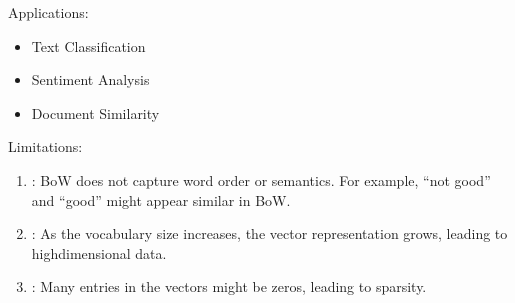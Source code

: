 \documentclass[letterpaper,11pt,english]{sphinxmanual}
\begin{document}
\sphinxAtStartPar
Applications:
\begin{itemize}
\item {} 
\sphinxAtStartPar
Text Classification

\item {} 
\sphinxAtStartPar
Sentiment Analysis

\item {} 
\sphinxAtStartPar
Document Similarity

\end{itemize}

\sphinxAtStartPar
Limitations:
\begin{enumerate}
%
\item {} 
\sphinxAtStartPar
{}:
\sphinxhyphen{} BoW does not capture word order or semantics.
\sphinxhyphen{} For example, “not good” and “good” might appear similar in BoW.

\item {} 
\sphinxAtStartPar
{}:
\sphinxhyphen{} As the vocabulary size increases, the vector representation grows, leading to high\sphinxhyphen{}dimensional data.

\item {} 
\sphinxAtStartPar
{}:
\sphinxhyphen{} Many entries in the vectors might be zeros, leading to sparsity.

\end{enumerate}
\end{document}
